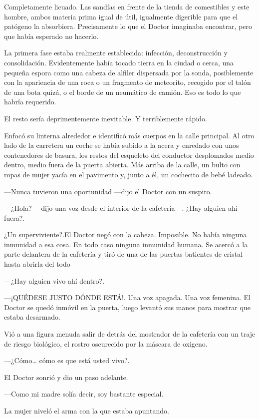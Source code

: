 Completamente licuado. Las sandías en frente de la tienda de comestibles
y este hombre, ambos materia prima igual de útil, igualmente digerible
para que el patógeno la absorbiera. Precisamente lo que el Doctor
imaginaba encontrar, pero que había esperado no hacerlo.

La primera fase estaba realmente establecida: infección, deconstrucción
y consolidación. Evidentemente había tocado tierra en la ciudad o cerca,
una pequeña espora como una cabeza de alfiler dispersada por la sonda,
posiblemente con la apariencia de una roca o un fragmento de meteorito,
recogido por el talón de una bota quizá, o el borde de un neumático de
camión. Eso es todo lo que habría requerido.

El resto sería deprimentemente inevitable. Y terriblemente rápido.

Enfocó su linterna alrededor e identificó más cuerpos en la calle
principal. Al otro lado de la carretera un coche se había subido a la
acera y enredado con unos contenedores de basura, los restos del
esqueleto del conductor desplomados medio dentro, medio fuera de la
puerta abierta. Más arriba de la calle, un bulto con ropas de mujer
yacía en el pavimento y, junto a él, un cochecito de bebé ladeado.

---Nunca tuvieron una oportunidad ---dijo el Doctor con un suspiro.

---¿Hola? ---dijo una voz desde el interior de la cafetería---. ¿Hay
alguien ahí fuera?.

¿Un superviviente?.El Doctor negó con la cabeza. Imposible. No había
ninguna inmunidad a esa cosa. En todo caso ninguna inmunidad humana. Se
acercó a la parte delantera de la cafetería y tiró de una de las puertas
batientes de cristal hasta abrirla del todo

---¿Hay alguien vivo ahí dentro?.

---¡QUÉDESE JUSTO DÓNDE ESTÁ!. Una voz apagada. Una voz femenina. El
Doctor se quedó inmóvil en la puerta, luego levantó sus manos para
mostrar que estaba desarmado.

Vió a una figura menuda salir de detrás del mostrador de la cafetería
con un traje de riesgo biológico, el rostro oscurecido por la máscara de
oxigeno.

---¿Cómo\ldots{} cómo es que está usted vivo?.

El Doctor sonrió y dio un paso adelante.

---Como mi madre solía decir, soy bastante especial.

La mujer niveló el arma con la que estaba apuntando.


